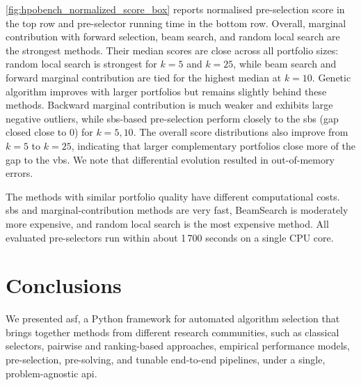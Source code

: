 \autoref{fig:hpobench_normalized_score_box} reports normalised pre-selection score in the top row and pre-selector running time in the bottom row. Overall, marginal contribution with forward selection, beam search, and random local search are the strongest methods. Their median scores are close across all portfolio sizes: random local search is strongest for $k=5$ and $k=25$, while beam search and forward marginal contribution are tied for the highest median at $k=10$. Genetic algorithm improves with larger portfolios but remains slightly behind these methods. Backward marginal contribution is much weaker and exhibits large negative outliers, while \gls{sbs}-based pre-selection perform closely to the \gls{sbs} (gap closed close to 0) for $k=5,10$. The overall score distributions also improve from $k=5$ to $k=25$, indicating that larger complementary portfolios close more of the gap to the \gls{vbs}. We note that differential evolution resulted in out-of-memory errors.

The methods with similar portfolio quality have different computational costs. \Gls{sbs} and marginal-contribution methods are very fast, BeamSearch is moderately more expensive, and random local search is the most expensive method. All evaluated pre-selectors run within about 1\,700 seconds on a single CPU core.




\section{Conclusions}
\label{sec:conclusion}
We presented \gls{asf}, a Python framework for automated algorithm selection that brings together methods from different research communities, such as classical selectors, pairwise and ranking-based approaches, empirical performance models, pre-selection, pre-solving, and tunable end-to-end pipelines, under a single, problem-agnostic \gls{api}.

